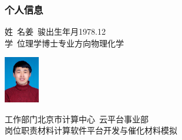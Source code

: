 \documentclass[cjk,slidestop,compress,mathserif,blue]{beamer}
\begin{document}
\small
\frame
{
	\frametitle{个人信息}
	\vskip -10pt
\begin{minipage}[b]{0.72\linewidth}
	姓~名\hspace{15pt}姜~骏\hspace{45pt}出生年月\hspace{15pt}\textrm{1978.12}\\
	\vskip 5pt
	学~位\hspace{15pt}理学博士\hspace{25pt}专业方向\hspace{15pt}物理化学\\
	\vspace*{10pt}
\end{minipage}
\hfill
\begin{minipage}[b]{0.26\linewidth}
	\vspace{20pt}
\includegraphics[height=0.8in]{Figures/Person_Photo.JPG}\\
\end{minipage}
	\vskip 15pt
	工作部门\hspace{5pt}北京市计算中心~云平台事业部\\
	\vskip 10pt
	岗位职责\hspace{5pt}材料计算软件平台开发与催化材料模拟
}
\end{document}
